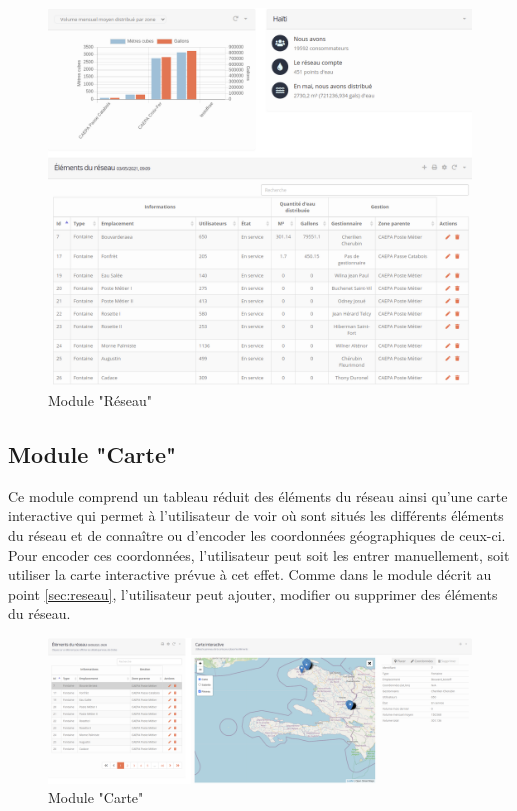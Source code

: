\documentclass{EPL-master-thesis-covers-FR}
\begin{document}
				\begin{figure}[H]
					\centering
					\includegraphics[width=1\textwidth]{images/water_elem}
					\caption{Module "Réseau"}
				\end{figure}
				
				
			\subsection{Module "Carte"}
				Ce module comprend un tableau réduit des éléments du réseau ainsi qu'une carte interactive qui permet à l'utilisateur de voir où sont situés les différents éléments du réseau et de connaître ou d'encoder les coordonnées géographiques de ceux-ci. Pour encoder ces coordonnées, l'utilisateur peut soit les entrer manuellement, soit utiliser la carte interactive prévue à cet effet. Comme dans le module décrit au point \ref{sec:reseau}, l'utilisateur peut ajouter, modifier ou supprimer des éléments du réseau.
			
				\begin{figure}[H]
					\centering
					\includegraphics[width=1\textwidth]{images/map}
					\caption{Module "Carte"}
				\end{figure}
				
\end{document}
